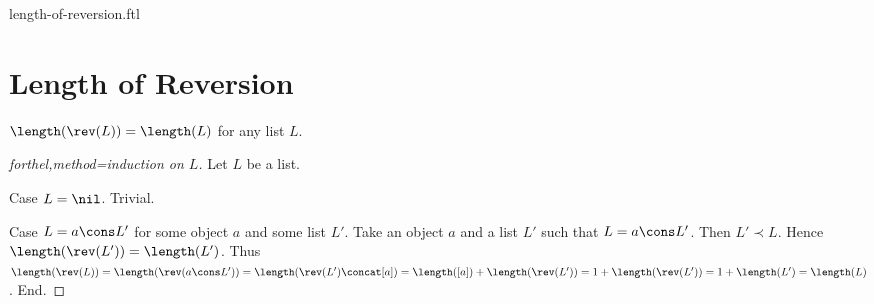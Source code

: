 \documentclass{naproche-library}
\begin{document}
\begin{smodule}{length-of-reversion.ftl}

  \section*{Length of Reversion}

  \begin{proposition}[forthel,id=LISTS_LENGTHREV_4512036658964875,printid]
    $\length(\rev(L)) = \length(L)$ for any list $L$.
  \end{proposition}
  \begin{proof}[forthel,method=induction on $L$]
    Let $L$ be a list.
    
    Case $L = \nil$. Trivial.
    
    Case $L = a \cons L'$ for some object $a$ and some list $L'$.
      Take an object $a$ and a list $L'$ such that $L = a \cons L'$.
      Then $L' \prec L$.
      Hence $\length(\rev(L')) = \length(L')$.
      Thus $\length(\rev(L))
        = \length(\rev(a \cons L'))
        = \length(\rev(L') \concat [a])
        = \length([a]) + \length(\rev(L'))
        = 1 + \length(\rev(L'))
        = 1 + \length(L')
        = \length(L)$.
    End.
  \end{proof}
\end{smodule}
\end{document}

